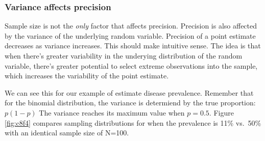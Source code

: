 \documentclass[
]{book}
\begin{document}
\subsubsection{Variance affects precision}\label{variance-affects-precision}

Sample size is not the \emph{only} factor that affects precision. Precision is also affected by the variance of the underlying random variable. Precision of a point estimate decreases as variance increases. This should make intuitive sense. The idea is that when there's greater variability in the underying distribution of the random variable, there's greater potential to select extreme observations into the sample, which increases the variability of the point estimate.

We can see this for our example of estimate disease prevalence. Remember that for the binomial distribution, the variance is determiend by the true proportion: \(p(1-p)\) The variance reaches its maximum value when \(p = 0.5\). Figure \ref{fig:c8f4} compares sampling distributions for when the prevalence is 11\% vs.~50\% with an identical sample size of N=100.
\end{document}
